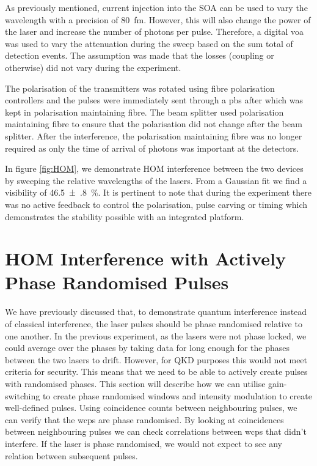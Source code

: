 As previously mentioned, current injection into the \ac{SOA} can be used to vary the wavelength with a precision of \SI{80}{\femto\metre}. However, this will also change the power of the laser and increase the number of photons per pulse. Therefore, a digital \ac{voa} was used to vary the attenuation during the sweep based on the sum total of detection events. The assumption was made that the losses (coupling or otherwise) did not vary during the experiment. 

The polarisation of the transmitters was rotated using fibre polarisation controllers and the pulses were immediately sent through a \ac{pbs} after which was kept in polarisation maintaining fibre. The beam splitter used polarisation maintaining fibre to ensure that the polarisation did not change after the beam splitter. After the interference, the polarisation maintaining fibre was no longer required as only the time of arrival of photons was important at the detectors.

In figure \ref{fig:HOM}, we demonstrate \acl{HOM} interference between the two devices by sweeping the relative wavelengths of the lasers. From a Gaussian fit we find a visibility of \SI{46.5(8)}{\percent}. It is pertinent to note that during the experiment there was no active feedback to control the polarisation, pulse carving or timing which demonstrates the stability possible with an integrated platform. 

\section{HOM Interference with Actively Phase Randomised Pulses}

We have previously discussed that, to demonstrate quantum interference instead of classical interference, the laser pulses should be phase randomised relative to one another. In the previous experiment, as the lasers were not phase locked, we could average over the phases by taking data for long enough for the phases between the two lasers to drift. However, for \ac{QKD} purposes this would not meet criteria for security. This means that we need to be able to actively create pulses with randomised phases. This section will describe how we can utilise gain-switching to create phase randomised windows and intensity modulation to create well-defined pulses. Using coincidence counts between neighbouring pulses, we can verify that the  \acp{wcp} are phase randomised. By looking at coincidences between neighbouring pulses we can check correlations between \acp{wcp} that didn't interfere. If the laser is phase randomised, we would not expect to see any relation between subsequent pulses. 


